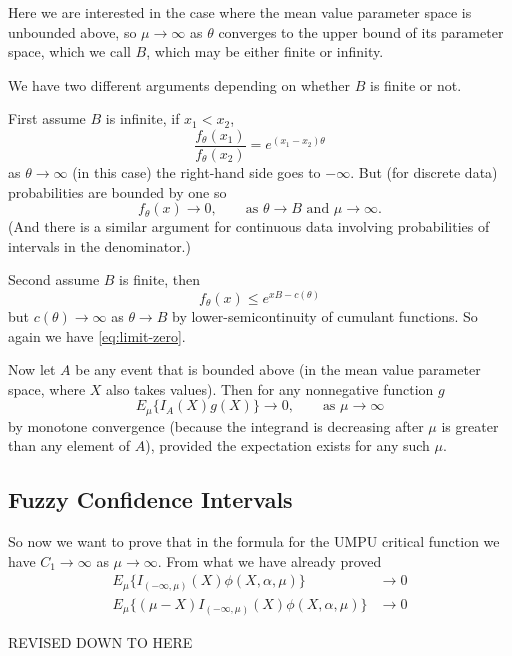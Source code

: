 \documentclass[11pt]{article}
\begin{document}
Here we are interested in the case where the mean value parameter space is
unbounded above, so $\mu \to \infty$ as $\theta$ converges to the upper
bound of its parameter space, which we call $B$, which may be either finite
or infinity.

We have two different arguments depending on whether $B$ is finite or not.

First assume $B$ is infinite, if $x_1 < x_2$,
$$
   \frac{f_\theta(x_1)}{f_\theta(x_2)} = e^{(x_1 - x_2) \theta}
$$
as $\theta \to \infty$ (in this case) the right-hand side goes to $- \infty$.
But (for discrete data) probabilities are bounded by one so
\begin{equation} \label{eq:limit-zero}
   f_\theta(x) \to 0, \qquad \text{as $\theta \to B$ and $\mu \to \infty$}.
\end{equation}
(And there is a similar argument for continuous data involving probabilities
of intervals in the denominator.)

Second assume $B$ is finite, then
$$
   f_\theta(x) \le e^{x B - c(\theta)}
$$
but $c(\theta) \to \infty$ as $\theta \to B$ by lower-semicontinuity
of cumulant functions.  So again we have \eqref{eq:limit-zero}.

Now let $A$ be any event that is bounded above (in the mean value parameter
space, where $X$ also takes values).  Then for any nonnegative function $g$
$$
    E_\mu \{ I_A(X) g(X) \} \to 0, \qquad \text{as $\mu \to \infty$}
$$
by monotone convergence (because the integrand is decreasing after $\mu$
is greater than any element of $A$), provided the expectation exists for
any such $\mu$.

\subsection{Fuzzy Confidence Intervals}

So now we want to prove that in the formula for the UMPU critical function
we have $C_1 \to \infty$ as $\mu \to \infty$.
From what we have already proved
\begin{align*}
   E_\mu\{ I_{(- \infty, \mu)}(X) \phi(X, \alpha, \mu) \} & \to 0
   \\
   E_\mu\{ (\mu - X) I_{(- \infty, \mu)}(X) \phi(X, \alpha, \mu) \} & \to 0
\end{align*}

\begin{center} \LARGE REVISED DOWN TO HERE \end{center}
\end{document}
